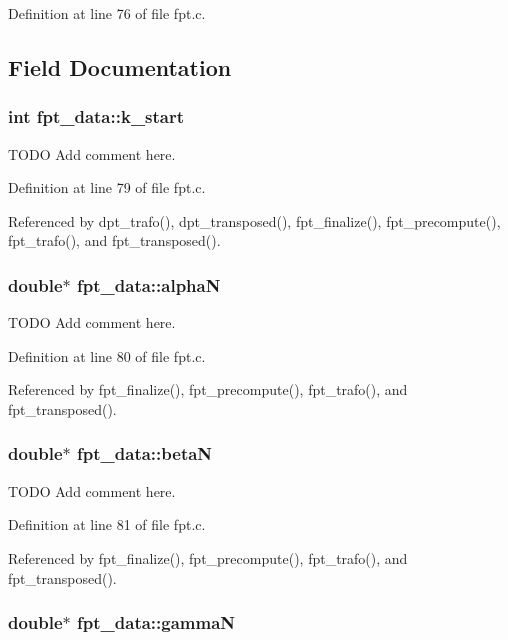 Definition at line 76 of file fpt.c.

\subsection{Field Documentation}
\hypertarget{structfpt__data_f8064f466928c78c4a530fb43dbc7663}{
\subsubsection{\setlength{\rightskip}{0pt plus 5cm}int {\bf fpt\_\-data::k\_\-start}}}
\label{structfpt__data_f8064f466928c78c4a530fb43dbc7663}


TODO Add comment here. 



Definition at line 79 of file fpt.c.

Referenced by dpt\_\-trafo(), dpt\_\-transposed(), fpt\_\-finalize(), fpt\_\-precompute(), fpt\_\-trafo(), and fpt\_\-transposed().\hypertarget{structfpt__data_eafd070ebb2e7c345750303d34a68890}{
\subsubsection{\setlength{\rightskip}{0pt plus 5cm}double$\ast$ {\bf fpt\_\-data::alphaN}}}
\label{structfpt__data_eafd070ebb2e7c345750303d34a68890}


TODO Add comment here. 



Definition at line 80 of file fpt.c.

Referenced by fpt\_\-finalize(), fpt\_\-precompute(), fpt\_\-trafo(), and fpt\_\-transposed().\hypertarget{structfpt__data_eace6f72b465a9bd2d8c399c69b7d9a9}{
\subsubsection{\setlength{\rightskip}{0pt plus 5cm}double$\ast$ {\bf fpt\_\-data::betaN}}}
\label{structfpt__data_eace6f72b465a9bd2d8c399c69b7d9a9}


TODO Add comment here. 



Definition at line 81 of file fpt.c.

Referenced by fpt\_\-finalize(), fpt\_\-precompute(), fpt\_\-trafo(), and fpt\_\-transposed().\hypertarget{structfpt__data_a6986fbcdce61cdbaf09c92632880feb}{
\subsubsection{\setlength{\rightskip}{0pt plus 5cm}double$\ast$ {\bf fpt\_\-data::gammaN}}}
\label{structfpt__data_a6986fbcdce61cdbaf09c92632880feb}


